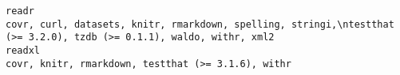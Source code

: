 \documentclass[
  letterpaper,
  DIV=11,
  numbers=noendperiod]{scrreprt}
\begin{document}
\begin{verbatim}
readr                                                                                                                                                                                                                                                                                                                                                                                                                                                                                                                                                                                                                                                                                                                                                                                                                                                                                                                                                                                                                                                                                                                                                                                    covr, curl, datasets, knitr, rmarkdown, spelling, stringi,\ntestthat (>= 3.2.0), tzdb (>= 0.1.1), waldo, withr, xml2
readxl                                                                                                                                                                                                                                                                                                                                                                                                                                                                                                                                                                                                                                                                                                                                                                                                                                                                                                                                                                                                                                                                                                                                                                                                                                                     covr, knitr, rmarkdown, testthat (>= 3.1.6), withr

\end{verbatim}
\end{document}
